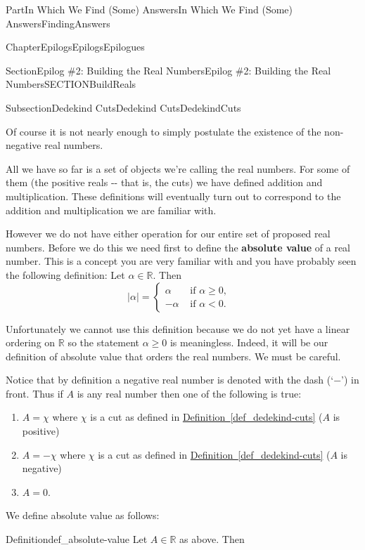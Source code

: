 \documentclass[oneside,10pt,]{book}
\newcommand{\xreffont}{\relax}
\newcommand{\terminology}[1]{\textbf{#1}}
\numberwithin{equation}{part}
\newcommand{\abs}[1]{\left|#1\right|}
\newcommand{\RR}{\mathbb {R}}
\newcommand{\lt}{<}
\newcommand{\amp}{&}
\begin{document}
\begin{partptx}{Part}{In Which We Find (Some) Answers}{}{In Which We Find (Some) Answers}{}{}{FindingAnswers}
\begin{chapterptx}{Chapter}{Epilogs}{}{Epilogs}{}{}{Epilogues}
\begin{sectionptx}{Section}{Epilog \#2: Building the Real Numbers}{}{Epilog \#2: Building the Real Numbers}{}{}{SECTIONBuildReals}
\begin{subsectionptx}{Subsection}{Dedekind Cuts}{}{Dedekind Cuts}{}{}{DedekindCuts}
\begin{quote}
\end{quote}
Of course it is not nearly enough to simply postulate the existence of the non-negative real numbers.%
\par
All we have so far is a set of objects we're calling the real numbers.  For some of them (the positive reals -{}-{} that is, the cuts) we have defined addition and multiplication. These definitions will eventually turn out to correspond to the addition and multiplication we are familiar with.%
\par
However we do not have either operation for our entire set of proposed real numbers.  Before we do this we need first to define the \terminology{absolute value} of a real number. This is a concept you are very familiar with and you have probably seen the following definition: Let \(\alpha\in\RR\).  Then%
\begin{equation*}
\abs{\alpha} = \begin{cases}\alpha\amp  \text{ if \(\alpha\ge0,\) } \\ -\alpha\amp  \text{ if \(\alpha\lt 0.\) } \end{cases}
\end{equation*}
%
\par
Unfortunately we cannot use this definition because we do not yet have a linear ordering on \(\RR\) so the statement \(\alpha\ge0\) is meaningless.  Indeed, it will be our definition of absolute value that orders the real numbers.  We must be careful.%
\par
Notice that by definition a negative real number is denoted with the dash (`\(-\)') in front.   Thus if \(A\) is any real number then one of the following is true:%
\begin{enumerate}
\item{}\(A=\chi\) where  \(\chi\) is a cut as defined in \hyperref[def_dedekind-cuts]{Definition~{\xreffont\ref{def_dedekind-cuts}}}  (\(A\) is positive)%
\item{}\(A=-\chi\) where  \(\chi\) is a cut as defined in \hyperref[def_dedekind-cuts]{Definition~{\xreffont\ref{def_dedekind-cuts}}} (\(A\) is negative)%
\item{}\(A=0\).%
\end{enumerate}
%
\par
We define absolute value as follows:%
\begin{definition}{Definition}{}{def_absolute-value}%
%
%
Let \(A\in\RR\) as above. Then%
\begin{equation*}

\end{equation*}
\end{definition}
\end{subsectionptx}
\end{sectionptx}
\end{chapterptx}
\end{partptx}
\end{document}
